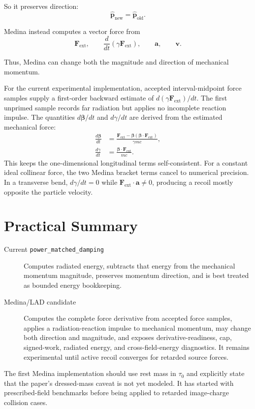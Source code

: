 \documentclass[11pt]{article}
\begin{document}
So it preserves direction:
\begin{equation}
\hat{\mathbf{p}}_{\mathrm{new}}
=
\hat{\mathbf{p}}_{\mathrm{old}}.
\end{equation}

Medina instead computes a vector force from
\begin{equation}
\mathbf{F}_{\mathrm{ext}}, \qquad
\frac{d}{dt}\left(\gamma\mathbf{F}_{\mathrm{ext}}\right), \qquad
\mathbf{a}, \qquad
\mathbf{v}.
\end{equation}

Thus, Medina can change both the magnitude and direction of mechanical
momentum.

For the current experimental implementation, accepted interval-midpoint force
samples supply a first-order backward estimate of
\(d(\gamma\mathbf{F}_{\mathrm{ext}})/dt\).  The first unprimed sample records
far radiation but applies no incomplete reaction impulse.
The quantities \(d\boldsymbol{\beta}/dt\) and \(d\gamma/dt\) are derived from
the estimated mechanical force:
\begin{align}
\frac{d\boldsymbol{\beta}}{dt}
&=
\frac{\mathbf{F}_{\mathrm{ext}}
- \boldsymbol{\beta}(\boldsymbol{\beta}\cdot\mathbf{F}_{\mathrm{ext}})}
{\gamma m c},
\\
\frac{d\gamma}{dt}
&=
\frac{\boldsymbol{\beta}\cdot\mathbf{F}_{\mathrm{ext}}}{m c}.
\end{align}
This keeps the one-dimensional longitudinal terms self-consistent. For a
constant ideal collinear force, the two Medina bracket terms cancel to
numerical precision. In a transverse bend, \(d\gamma/dt=0\) while
\(\mathbf{F}_{\mathrm{ext}}\cdot\mathbf{a}\neq 0\), producing a recoil mostly
opposite the particle velocity.

\section{Practical Summary}

\begin{description}
\item[Current \texttt{power\_matched\_damping}]
Computes radiated energy, subtracts that energy from the mechanical momentum
magnitude, preserves momentum direction, and is best treated as bounded energy
bookkeeping.

\item[Medina/LAD candidate]
Computes the complete force derivative from accepted force samples, applies a
radiation-reaction impulse to mechanical momentum, may change both direction
and magnitude, and exposes derivative-readiness, cap, signed-work, radiated
energy, and cross-field-energy diagnostics.  It remains experimental until
active recoil converges for retarded source forces.
\end{description}

The first Medina implementation should use rest mass in \(\tau_0\) and
explicitly state that the paper's dressed-mass caveat is not yet modeled. It
has started with prescribed-field benchmarks before being applied to retarded
image-charge collision cases.
\end{document}

